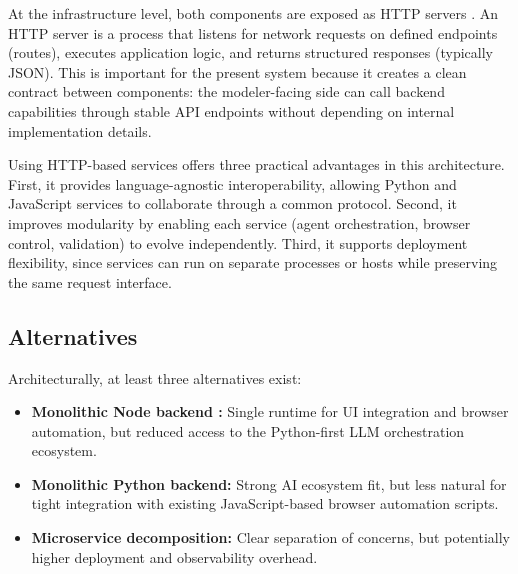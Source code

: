 At the infrastructure level, both components are exposed as HTTP servers \cite{mozillaWhatServer}. An HTTP server is a process that listens for network requests on defined endpoints (routes), executes application logic, and returns structured responses (typically JSON). This is important for the present system because it creates a clean contract between components: the modeler-facing side can call backend capabilities through stable API endpoints without depending on internal implementation details.

Using HTTP-based services offers three practical advantages in this architecture. First, it provides language-agnostic interoperability, allowing Python and JavaScript services to collaborate through a common protocol. Second, it improves modularity by enabling each service (agent orchestration, browser control, validation) to evolve independently. Third, it supports deployment flexibility, since services can run on separate processes or hosts while preserving the same request interface. 

\subsection{Alternatives}
Architecturally, at least three alternatives exist:
\begin{itemize}
    \item \textbf{Monolithic Node backend \cite{ibmWhatMonolithic}:} Single runtime for UI integration and browser automation, but reduced access to the Python-first LLM orchestration ecosystem.
    \item \textbf{Monolithic Python backend:} Strong AI ecosystem fit, but less natural for tight integration with existing JavaScript-based browser automation scripts.
    \item \textbf{Microservice decomposition:} Clear separation of concerns, but potentially higher deployment and observability overhead.
\end{itemize}

